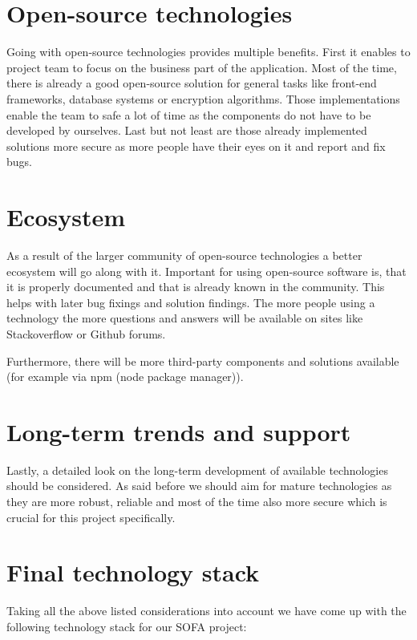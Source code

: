 \section{Open-source technologies}\label{sec:open-source-technologies}

Going with open-source technologies provides multiple benefits.
First it enables to project team to focus on the business part of the application.
Most of the time, there is already a good open-source solution for general tasks like front-end frameworks, database
systems or encryption algorithms.
Those implementations enable the team to safe a lot of time as the components do not have to be developed by ourselves.
Last but not least are those already implemented solutions more secure as more people have their eyes on it and report
and fix bugs.

\section{Ecosystem}\label{sec:ecosystem}

As a result of the larger community of open-source technologies a better ecosystem will go along with it.
Important for using open-source software is, that it is properly documented and that is already known in the community.
This helps with later bug fixings and solution findings.
The more people using a technology the more questions and answers will be available on sites like Stackoverflow or
Github forums.

Furthermore, there will be more third-party components and solutions available
(for example via npm (node package manager)).

\section{Long-term trends and support}\label{sec:long-term-trends-and-support}

Lastly, a detailed look on the long-term development of available technologies should be considered.
As said before we should aim for mature technologies as they are more robust, reliable and most of the time also more
secure which is crucial for this project specifically.

\section{Final technology stack}\label{sec:final-technology-stack}

Taking all the above listed considerations into account we have come up with the following technology stack for our
SOFA project:

